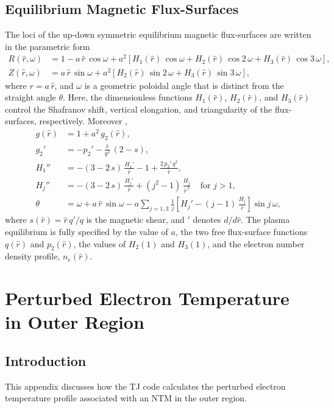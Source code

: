 \documentclass{iopjournal}
\begin{document}
{\subsection{Equilibrium Magnetic Flux-Surfaces}\label{surf}
The loci of the up-down symmetric equilibrium magnetic flux-surfaces are written in the parametric form \cite{tear5}
\begin{align}
R(\hat{r},\omega) &= 1 -a\,\hat{r}\,\cos\omega + a^{2}\left[H_1(\hat{r})\,\cos \omega + H_2(\hat{r})\,\cos 2\,\omega+H_3(\hat{r})\,\cos 3\,\omega\right], \label{e19x}\\[0.5ex]
Z(\hat{r},\omega)&= a\,\hat{r}\,\sin\omega +a^{2}\left[H_2(\hat{r})\,\sin 2\,\omega+H_3(\hat{r})\,\sin 3\,\omega\right], \label{e20x}
\end{align}
where  $r=a\,\hat{r}$, and $\omega$ is a geometric poloidal angle that is distinct from the straight angle $\theta$. 
Here, the dimensionless functions $H_1(\hat{r})$, $H_2(\hat{r})$, and $H_3(\hat{r})$ control the Shafranov shift, vertical elongation, and  triangularity of
the flux-surfaces, respectively. 
Moreover \cite{exp}, 
\begin{align}
g(\hat{r}) &= 1+ a^2\,g_2(\hat{r}),\\[0.5ex]
g_2'&= -p_2' - \frac{\hat{r}}{q^2}\,(2-s),\\[0.5ex]
H_1''&= -(3-2\,s)\,\frac{H_1' }{\hat{r}}-1+\frac{2\,p_2'\,q^2}{\hat{r}},\label{e27}\\[0.5ex]
H_j''&= -(3-2\,s)\,\frac{H_j'}{\hat{r}}+(j^2-1)\,\frac{H_j}{\hat{r}^{\,2}}~~~~~\mbox{for $j>1$},\label{e33x}\\[0.5ex]
\theta &= \omega+a\,\hat{r}\,\sin\omega - a\sum_{j=1,3}\frac{1}{j}\left[H_j'-(j-1)\,\frac{H_j}{\hat{r}}\right]\sin j\,\omega,
\end{align}
where $s(\hat{r}) = \hat{r}\,q'/q$ is the magnetic shear, and $'$ denotes $d/d\hat{r}$. The plasma equilibrium is fully specified by the value of $a$, the two free
flux-surface functions $q(\hat{r})$ and $p_2(\hat{r})$, the values of $H_2(1)$ and $H_3(1)$, and the electron number density profile, $n_e(\hat{r})$. 

\section{Perturbed Electron Temperature in Outer Region}\label{outer}
\subsection{Introduction}
This appendix discusses how the TJ code calculates the perturbed electron temperature profile associated with an NTM in the outer region. 

}
\end{document}
